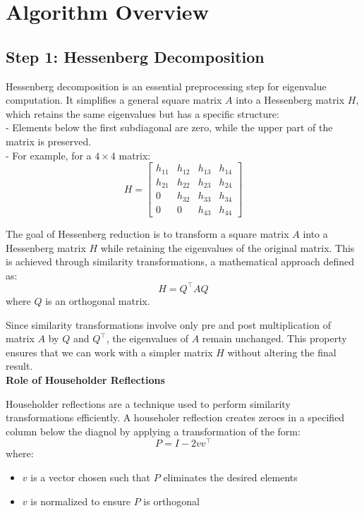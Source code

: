 \documentclass[a4paper,11pt,oneside]{report}
\begin{document}
\chapter{ Algorithm Overview}

\section{ Step 1: Hessenberg Decomposition}
Hessenberg decomposition is an essential preprocessing step for eigenvalue computation. It simplifies a general square matrix \( A \) into a Hessenberg matrix \( H \), which retains the same eigenvalues but has a specific structure:\\
- Elements below the first subdiagonal are zero, while the upper part of the matrix is preserved.\\
- For example, for a \( 4 \times 4 \) matrix:\\
  \[
  H = 
  \begin{bmatrix}
  h_{11} & h_{12} & h_{13} & h_{14} \\
  h_{21} & h_{22} & h_{23} & h_{24} \\
  0 & h_{32} & h_{33} & h_{34} \\
  0 & 0 & h_{43} & h_{44}
  \end{bmatrix}
  \]

The goal of Hessenberg reduction is to transform a square matrix $A$ into a Hessenberg matrix $H$ while retaining the eigenvalues of the original matrix. This is achieved through similarity transformations, a mathematical approach defined as:
\[
H = Q^\top AQ
\]
where $Q$ is an orthogonal matrix.

Since similarity transformations involve only pre and post multiplication of matrix $A$ by $Q$ and $Q^\top$, the eigenvalues of $A$ remain unchanged. This property ensures that we can work with a simpler matrix $H$ without altering the final result.\\

\textbf{Role of Householder Reflections}

Householder reflections are a technique used to perform similarity transformations efficiently. A householer reflection creates zeroes in a specified column below the diagnol by applying a transformation of the form:
\[
P = I-2vv^\top
\]
where:
\begin{itemize}
    \item $v$ is a vector chosen such that $P$ eliminates the desired elements
    \item $v$ is normalized to ensure $P$ is orthogonal
\end{itemize}
\end{document}
